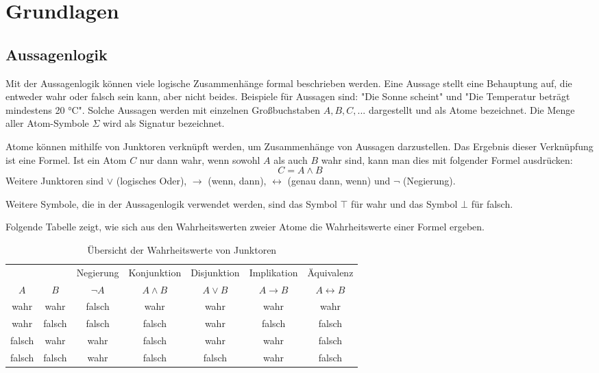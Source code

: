 
\chapter{Grundlagen}
	\section{Aussagenlogik}

Mit der Aussagenlogik können viele logische Zusammenhänge formal beschrieben werden. Eine Aussage stellt eine Behauptung auf, die entweder wahr oder falsch sein kann, aber nicht beides. Beispiele für Aussagen sind: "Die Sonne scheint" und "Die Temperatur beträgt mindestens 20 °C". Solche Aussagen werden mit einzelnen Großbuchstaben $A, B, C, ...$ dargestellt und als Atome bezeichnet. Die Menge aller Atom-Symbole $\Sigma$ wird als Signatur bezeichnet. 

Atome können mithilfe von Junktoren verknüpft werden, um Zusammenhänge von Aussagen darzustellen. Das Ergebnis dieser Verknüpfung ist eine Formel. Ist ein Atom $C$ nur dann wahr, wenn sowohl $A$ als auch $B$ wahr sind, kann man dies mit folgender Formel ausdrücken:
$$C=A \wedge B$$
Weitere Junktoren sind $\vee$ (logisches Oder), $\to$ (wenn, dann), $\leftrightarrow$ (genau dann, wenn) und $\neg$ (Negierung).

Weitere Symbole, die in der Aussagenlogik verwendet werden, sind das Symbol $\top$ für wahr und das Symbol $\bot$ für falsch. 

Folgende Tabelle zeigt, wie sich aus den Wahrheitswerten zweier Atome die Wahrheitswerte einer Formel ergeben.

\begin{table}[h]
	\centering
	\begin{tabular}{| c | c || c | c | c | c | c |}
		\hline
		&& Negierung & Konjunktion & Disjunktion & Implikation & Äquivalenz \\
		$A$ & $B$ & $\neg A$ & $A \wedge B$ & $A \vee B$ & $A \to B$ & $A \leftrightarrow B$ \\
		\hline
		wahr & wahr & falsch & wahr & wahr & wahr & wahr \\
		wahr & falsch & falsch & falsch & wahr & falsch & falsch \\
		falsch & wahr & wahr & falsch & wahr & wahr & falsch \\
		falsch & falsch & wahr & falsch & falsch & wahr & falsch \\
		\hline
	\end{tabular}
	\caption{Übersicht der Wahrheitswerte von Junktoren}
	\label{table:Junktoren}
\end{table}

